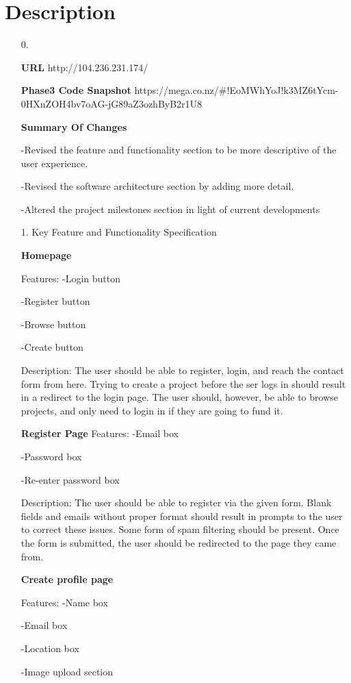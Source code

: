 \documentclass[12pt]{article}
\begin{document}
\section*{Description}
\begin{enumerate}

\item[0.]

\textbf{URL}
http://104.236.231.174/

\textbf{Phase3 Code Snapshot}
https://mega.co.nz/#!EoMWhYoJ!k3MZ6tYcm-0HXnZOH4bv7oAG-jG89aZ3ozhByB2r1U8

\textbf{Summary Of Changes}

-Revised the feature and functionality section to be more descriptive of the user experience.

-Revised the software architecture section by adding more detail.

-Altered the project milestones section in light of current developments

\item[1.] Key Feature and Functionality Specification

\textbf{Homepage}

Features:
-Login button

-Register button

-Browse button

-Create button

Description: The user should be able to register, login, and reach the contact form from here.
Trying to create a project before the ser logs in should result in a redirect to the login page.
The user should, however, be able to browse projects, and only need to login in if they are going to fund it.

\textbf{Register Page}
Features:
-Email box

-Password box

-Re-enter password box

Description:
The user should be able to register via the given form.
Blank fields and emails without proper format should result in prompts to the user to correct these issues.
Some form of spam filtering should be present.
Once the form is submitted, the user should be redirected to the page they came from.

\textbf{Create profile page}

Features:
-Name box

-Email box

-Location box

-Image upload section


\end{enumerate}
\end{document}
